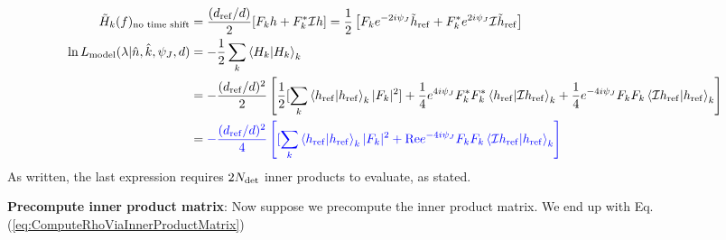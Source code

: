 \documentclass[twocolumn,prd,nofootinbib]{revtex4}
\newcommand\ForRichardOnly[1]{}
\newcommand\qmstateproduct[2]{\left\langle#1|#2\right\rangle}
\begin{document}
\begin{widetext}
\begin{itemize}
\begin{align}
\tilde{H}_k(f)_{\text{no time shift}} &= \frac{(d_{\rm ref}/d)}{2}[F_k h + F^*_k {\cal I} h]
   = \frac{1}{2}\left[
   F_k e^{-2i\psi_J} \tilde{h}_{\rm ref} +F_k^* e^{2i\psi_J}{\cal I}\tilde{h}_{\rm ref}
  \right] \\
\ln L_{\rm model}(\lambda|\hat{n},\hat{k},\psi_J,d) &= -\frac{1}{2} \sum_k\qmstateproduct{H_k}{H_k}_k 
 \\
&= -\frac{(d_{\rm ref}/d)^2}{2}
\left[ \frac{1}{2} [ \sum_k \qmstateproduct{h_{\rm    ref}}{h_{\rm ref}}_k |F_k |^2 ]
 +\frac{1}{4} e^{4i\psi_J} F_k^* F_k^* \qmstateproduct{h_{\rm ref}}{{\cal I}h_{\rm ref}}_k
 + \frac{1}{4} e^{-4i\psi_J} F_k F_k \qmstateproduct{{\cal I} h_{\rm ref}}{h_{\rm ref}}_k 
\right] \\
&= 
{\color{blue}
-\frac{(d_{\rm ref}/d)^2}{4}
\left[  [ \sum_k \qmstateproduct{h_{\rm    ref}}{h_{\rm ref}}_k|F_k|^2 
 + \text{Re} e^{-4i\psi_J} F_k F_k \qmstateproduct{{\cal I} h_{\rm ref}}{h_{\rm ref}}_k 
\right]
}
\end{align}
As written, the last expression requires $2N_{\rm det}$ inner products to evaluate, as stated.  

\noindent \textbf{Precompute inner product matrix}: Now suppose we precompute the inner product matrix.  We end up with 
Eq. (\ref{eq:ComputeRhoViaInnerProductMatrix})

\end{itemize}

\ForRichardOnly{
\noindent \textbf{Marginalization scheme}: We want to evaluate $L_{\rm red} \equiv \int p(\theta)L(\lambda,\theta)$:

\begin{itemize}
\item \emph{Easy extrinsic first}: Marginalize over $t,d$ and perhaps $\psi_J$ first: these require no $O(N)$
  operations.  For example, in the first case $L_{\rm model}=-\rho^2/2$ scales trivially as $1/d^2$.

I recommend doing this 1d or 2d integral with raw quadrature -- particularly the 1d time case, which requires some care.


\end{itemize}}
\end{widetext}
\end{document}

